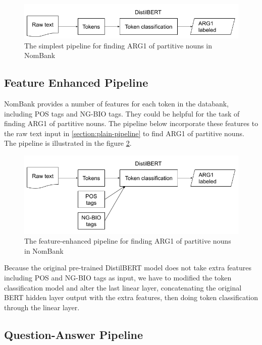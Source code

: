 \documentclass[11pt]{article}
\begin{document}
\begin{figure}[h]
  \centering
  \includegraphics[width=\linewidth]{assets/simplest-arg1-pipeline.png}
  \caption{The simplest pipeline for finding ARG1 of partitive nouns in NomBank}
  \label{fig:simplest-arg1-pipeline}
\end{figure}

\subsection{Feature Enhanced Pipeline}

NomBank provides a number of features for each token in the databank, including POS tags and NG-BIO tags. They could be helpful for the task of finding ARG1 of partitive nouns. The pipeline below incorporate these features to the raw text input in \ref{section:plain-pipeline} to find ARG1 of partitive nouns. The pipeline is illustrated in the figure \ref{fig:enhanced-arg1-pipeline}.

\begin{figure}[h]
  \centering
  \includegraphics[width=\linewidth]{assets/enhanced-arg1-pipeline.png}
  \caption{The feature-enhanced pipeline for finding ARG1 of partitive nouns in NomBank}
  \label{fig:enhanced-arg1-pipeline}
\end{figure}

Because the original pre-trained DistilBERT model does not take extra features including POS and NG-BIO tags as input, we have to modified the token classification model and alter the last linear layer, concatenating the original BERT hidden layer output with the extra features, then doing token classification through the linear layer.

\subsection{Question-Answer Pipeline}
\end{document}
